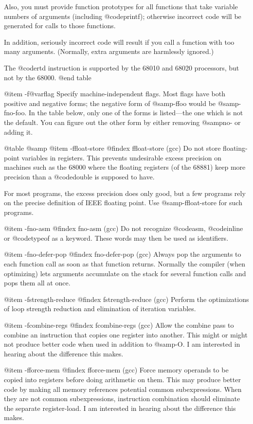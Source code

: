 {Also, you must provide function prototypes for all functions that
take variable numbers of arguments (including @code{printf});
otherwise incorrect code will be generated for calls to those
functions.

In addition, seriously incorrect code will result if you call a
function with too many arguments.  (Normally, extra arguments are
harmlessly ignored.)

The @code{rtd} instruction is supported by the 68010 and 68020
processors, but not by the 68000.
@end table

@item -f@var{flag}
Specify machine-independent flags.  Most flags have both positive and
negative forms; the negative form of @samp{-ffoo} would be
@samp{-fno-foo}.  In the table below, only one of the forms is
listed---the one which is not the default.  You can figure out the
other form by either removing @samp{no-} or adding it.

@table @samp
@item -ffloat-store
@findex ffloat-store (gcc)
Do not store floating-point variables in registers.  This
prevents undesirable excess precision on machines such as the
68000 where the floating registers (of the 68881) keep more
precision than a @code{double} is supposed to have.

For most programs, the excess precision does only good, but a few
programs rely on the precise definition of IEEE floating point.
Use @samp{-ffloat-store} for such programs.

@item -fno-asm
@findex fno-asm (gcc)
Do not recognize @code{asm}, @code{inline} or @code{typeof} as a
keyword.  These words may then be used as identifiers.

@item -fno-defer-pop
@findex fno-defer-pop (gcc)
Always pop the arguments to each function call as soon as that
function returns.  Normally the compiler (when optimizing) lets
arguments accumulate on the stack for several function calls and
pops them all at once.

@item -fstrength-reduce
@findex fstrength-reduce (gcc)
Perform the optimizations of loop strength reduction and
elimination of iteration variables.

@item -fcombine-regs
@findex fcombine-regs (gcc)
Allow the combine pass to combine an instruction that copies one
register into another. This might or might not produce better
code when used in addition to @samp{-O}. I am interested in
hearing about the difference this makes.

@item -fforce-mem
@findex fforce-mem (gcc)
Force memory operands to be copied into registers before doing
arithmetic on them.  This may produce better code by making all
memory references potential common subexpressions.  When they are
not common subexpressions, instruction combination should
eliminate the separate register-load.  I am interested in hearing
about the difference this makes.

}
